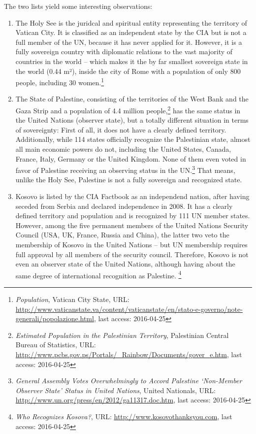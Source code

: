 The two lists yield some interesting observations:
\begin{enumerate}
  \item The Holy See is the juridcal and spiritual entity representing the territory of Vatican City. It is classified as an independent state by the CIA but is not a full member of the UN, because it has never applied for it. However, it is a fully sovereign country with diplomatic relations to the vast majority of countries in the world -- which makes it the by far smallest sovereign state in the world (0.44 m²), inside the city of Rome with a population of only 800 people, including 30 women.\footnote{\textit{Population}, Vatican City State, URL: \url{http://www.vaticanstate.va/content/vaticanstate/en/stato-e-governo/note-generali/popolazione.html}, last access: 2016-04-25}

  \item The State of Palestine, consisting of the territories of the West Bank and the Gaza Strip and a population of 4.4 million people,\footnote{\textit{Estimated Population in the Palestinian Territory}, Palestinian Central Bureau of Statistics, URL: \url{http://www.pcbs.gov.ps/Portals/_Rainbow/Documents/gover_e.htm}, last access: 2016-04-25}
  has the same status in the United Nations (observer state), but a totally different situation in terms of sovereignty: First of all, it does not have a clearly defined territory. Additionally, while 114 states officially recognize the Palestinian state, almost all main economic powers do not, including the United States, Canada, France, Italy, Germany or the United Kingdom. None of them even voted in favor of Palestine receiving an observing status in the UN.\footnote{\textit{General Assembly Votes Overwhelmingly to Accord Palestine ‘Non-Member Observer State’ Status in United Nations}, United Nationals, URL: \url{http://www.un.org/press/en/2012/ga11317.doc.htm}, last access: 2016-04-25}
  That means, unlike the Holy See, Palestine is not a fully sovereign and recognized state.

  \item Kosovo is listed by the CIA Factbook as an independend nation, after having seceded from Serbia and declared independence in 2008. It has a clearly defined territory and population and is recognized by 111 UN member states. However, among the five permanent members of the United Nations Security Council (USA, UK, France, Russia and China), the latter two veto the membership of Kosovo in the United Nations -- but UN membership requires full approval by all members of the security council. Therefore, Kosovo is not even an observer state of the United Nations, although having about the same degree of international recognition as Palestine.
  \footnote{\textit{Who Recognizes Kosova?}, URL: \url{http://www.kosovothanksyou.com}, last access: 2016-04-25}


\end{enumerate}
